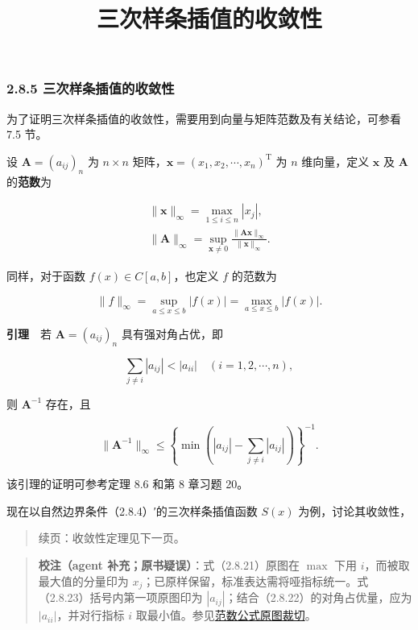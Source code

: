 \documentclass[
  10pt,
  fontset=fandol]{ctexart}
\title{三次样条插值的收敛性}
\author{}
\date{}
\begin{document}
\maketitle

\subsubsection{2.8.5 三次样条插值的收敛性}\label{ux4e09ux6b21ux6837ux6761ux63d2ux503cux7684ux6536ux655bux6027}

为了证明三次样条插值的收敛性，需要用到向量与矩阵范数及有关结论，可参看 7.5 节。

设 \(\boldsymbol A=(a_{ij})_n\) 为 \(n\times n\) 矩阵，\(\boldsymbol x=(x_1,x_2,\cdots,x_n)^{\mathrm T}\) 为 \(n\) 维向量，定义 \(\boldsymbol x\) 及 \(\boldsymbol A\) 的\textbf{范数}为

\[\begin{gathered}
\|\boldsymbol x\|_\infty=\max_{1\leqslant i\leqslant n}|x_j|,\\
\|\boldsymbol A\|_\infty=\sup_{\boldsymbol x\ne0}\frac{\|\boldsymbol A\boldsymbol x\|_\infty}{\|\boldsymbol x\|_\infty}.
\end{gathered}\tag{2.8.21}\]

同样，对于函数 \(f(x)\in C[a,b]\)，也定义 \(f\) 的范数为

\[\|f\|_\infty=\sup_{a\leqslant x\leqslant b}|f(x)|=\max_{a\leqslant x\leqslant b}|f(x)|.\]

\textbf{引理}　若 \(\boldsymbol A=(a_{ij})_n\) 具有强对角占优，即

\[\sum_{j\ne i}|a_{ij}|<|a_{ii}|\quad(i=1,2,\cdots,n),\tag{2.8.22}\]

则 \(\boldsymbol A^{-1}\) 存在，且

\[\|\boldsymbol A^{-1}\|_\infty\leqslant\left\{\min\left(|a_{ij}|-\sum_{j\ne i}|a_{ij}|\right)\right\}^{-1}.\tag{2.8.23}\]

该引理的证明可参考定理 8.6 和第 8 章习题 20。

现在以自然边界条件（2.8.4）′的三次样条插值函数 \(S(x)\) 为例，讨论其收敛性，

\begin{quote}
续页：收敛性定理见下一页。
\end{quote}

\begin{quote}
\textbf{校注（agent 补充；原书疑误）}：式（2.8.21）原图在 \(\max\) 下用 \(i\)，而被取最大值的分量印为 \(x_j\)；已原样保留，标准表达需将哑指标统一。式（2.8.23）括号内第一项原图印为 \(|a_{ij}|\)；结合（2.8.22）的对角占优量，应为 \(|a_{ii}|\)，并对行指标 \(i\) 取最小值。参见\href{../assets/ch02b/pdf-054-norm-detail.png}{范数公式原图裁切}。
\end{quote}
\end{document}
